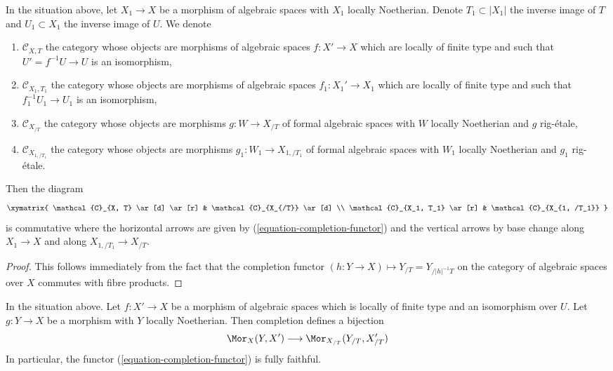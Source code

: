 \begin{lemma}
\label{lemma-functoriality-completion-functor}
In the situation above, let $X_1 \to X$ be a morphism of algebraic
spaces with $X_1$ locally Noetherian. Denote $T_1 \subset |X_1|$
the inverse image of $T$ and $U_1 \subset X_1$ the inverse image of $U$.
We denote
\begin{enumerate}
\item $\mathcal{C}_{X, T}$ the category whose objects are
morphisms of algebraic spaces $f : X' \to X$ which are locally
of finite type and such that $U' = f^{-1}U \to U$ is an isomorphism,
\item $\mathcal{C}_{X_1, T_1}$ the category whose objects are
morphisms of algebraic spaces $f_1 : X_1' \to X_1$ which are locally
of finite type and such that $f_1^{-1}U_1 \to U_1$ is an isomorphism,
\item $\mathcal{C}_{X_{/T}}$ the category whose objects are
morphisms $g : W \to X_{/T}$ of formal algebraic spaces
with $W$ locally Noetherian and $g$ rig-\'etale,
\item $\mathcal{C}_{X_{1, /T_1}}$ the category whose objects are
morphisms $g_1 : W_1 \to X_{1, /T_1}$ of formal algebraic spaces
with $W_1$ locally Noetherian and $g_1$ rig-\'etale.
\end{enumerate}
Then the diagram
$$
\xymatrix{
\mathcal{C}_{X, T} \ar[d] \ar[r] &
\mathcal{C}_{X_{/T}} \ar[d] \\
\mathcal{C}_{X_1, T_1} \ar[r] &
\mathcal{C}_{X_{1, /T_1}}
}
$$
is commutative where the horizontal arrows are given by
(\ref{equation-completion-functor})
and the vertical arrows by base change along
$X_1 \to X$ and along $X_{1, /T_1} \to X_{/T}$.
\end{lemma}

\begin{proof}
This follows immediately from the fact that the completion functor
$(h : Y \to X) \mapsto Y_{/T} = Y_{/|h|^{-1}T}$
on the category of algebraic spaces over $X$
commutes with fibre products.
\end{proof}

\begin{lemma}
\label{lemma-completion-functor-fully-faithful}
In the situation above. Let $f : X' \to X$ be a morphism of algebraic spaces
which is locally of finite type and an isomorphism over $U$. Let
$g : Y \to X$ be a morphism with $Y$ locally Noetherian. Then completion
defines a bijection
$$
\Mor_X(Y, X') \longrightarrow \Mor_{X_{/T}}(Y_{/T}, X'_{/T})
$$
In particular, the functor (\ref{equation-completion-functor}) is
fully faithful.
\end{lemma}

